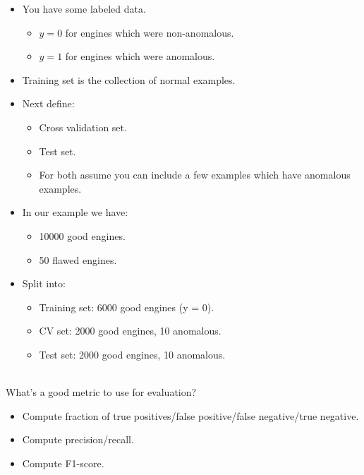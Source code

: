 \documentclass{article}
\begin{document}
\begin{itemize}
  \item You have some labeled data.

        \begin{itemize}
          \item $y=0$ for engines which were non-anomalous.
          \item $y=1$ for engines which were anomalous.
        \end{itemize}

  \item Training set is the collection of normal examples.
  \item Next define:

        \begin{itemize}
          \item Cross validation set.
          \item Test set.
          \item For both assume you can include a few examples which have anomalous examples.
        \end{itemize}

  \item In our example we have:

        \begin{itemize}
          \item 10000 good engines.
          \item 50 flawed engines.
        \end{itemize}
        
  \item Split into:

        \begin{itemize}
          \item Training set: 6000 good engines (y = 0).
          \item CV set: 2000 good engines, 10 anomalous.
          \item Test set: 2000 good engines, 10 anomalous.
        \end{itemize}
        
\end{itemize}


~\\
What's a good metric to use for evaluation?

\begin{itemize}
  \item Compute fraction of true positives/false positive/false negative/true negative.
  \item Compute precision/recall.
  \item Compute F1-score.
\end{itemize}
\end{document}
